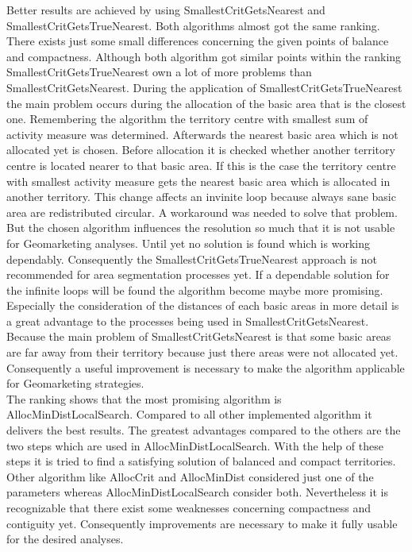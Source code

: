 Better results are achieved by using SmallestCritGetsNearest and SmallestCritGetsTrueNearest. Both algorithms almost got the same ranking. There exists just some small differences concerning the given points of balance and compactness. Although both algorithm got similar points within the ranking SmallestCritGetsTrueNearest own a lot of more problems than SmallestCritGetsNearest. During the application of SmallestCritGetsTrueNearest the main problem occurs during the allocation of the basic area that is the closest one. Remembering the algorithm the territory centre with smallest sum of activity measure was determined. Afterwards the nearest basic area which is not allocated yet is chosen. Before allocation it is checked whether another territory centre is located nearer to that basic area. If this is the case the territory centre with smallest activity measure gets the nearest basic area which is allocated in another territory. This change affects an invinite loop because always sane basic area are redistributed circular. A workaround was needed to solve that problem. But the chosen algorithm influences the resolution so much that it is not usable for Geomarketing analyses. Until yet no solution is found which is working dependably. Consequently the SmallestCritGetsTrueNearest approach is not recommended for area segmentation processes yet. If a dependable solution for the infinite loops will be found the algorithm become maybe more promising. Especially the consideration of the distances of each basic areas in more detail is a great advantage to the processes being used in SmallestCritGetsNearest. Because the main problem of SmallestCritGetsNearest is that some basic areas are far away from their territory because just there areas were not allocated yet. Consequently a useful improvement is necessary to make the algorithm applicable for Geomarketing strategies. \\The ranking shows that the most promising algorithm is AllocMinDistLocalSearch. Compared to all other implemented algorithm it delivers the best results. The greatest advantages compared to the others are the two steps which are used in AllocMinDistLocalSearch. With the help of these steps it is tried to find a satisfying solution of balanced and compact territories. Other algorithm like AllocCrit and AllocMinDist considered just one of the parameters whereas AllocMinDistLocalSearch consider both. Nevertheless it is recognizable that there exist some weaknesses concerning compactness and contiguity yet. Consequently improvements are necessary to make it fully usable for the desired analyses. 

